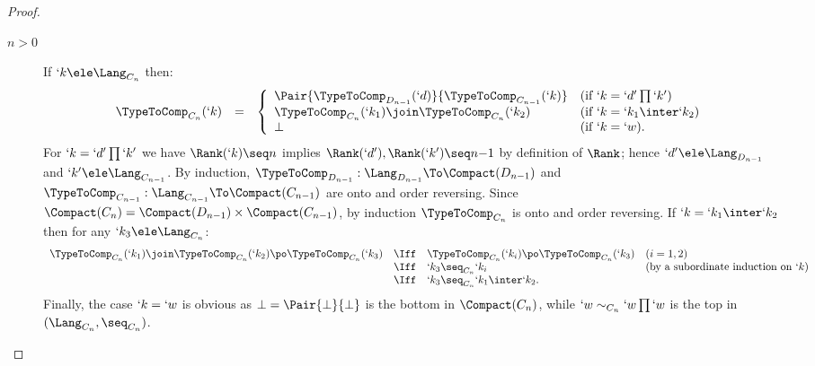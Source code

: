 \documentclass{lmcs}
\begin{document}
\begin{proof}
\begin{description}
 \item[$n>0$]
If $`k \ele \Lang_{C_n}$ then:
%
 \[ \begin{array}{rcl}
 \TypeToComp_{C_n}(`k) 
	&=& 
\left \{
 \begin{array}{ll}
	\Pair{\TypeToComp_{D_{n{-}1}}(`d) }{ \TypeToComp_{C_{n{-}1}}(`k)} & (\textrm{if }`k = `d'\prod `k') \\
	\TypeToComp_{C_n}(`k_1)\join \TypeToComp_{C_n}(`k_2) & (\textrm{if }`k = `k_1\inter`k_2) \\
	\bot & (\textrm{if }`k = `w).
 \end{array} \right.
 \end{array} \]
For $`k = `d'\prod `k'$ we have $\Rank(`k) \seq n$ implies $\Rank(`d'),\Rank(`k') \seq n{-}1$ by definition of $\Rank$; hence 
$`d' \ele \Lang_{D_{n{-}1}}$ and $`k' \ele \Lang_{C_{n{-}1}}$. 
By induction, $\TypeToComp_{D_{n{-}1}}: \Lang_{D_{n{-}1}} \To \Compact(D_{n{-}1})$ and
$\TypeToComp_{C_{n{-}1}}: \Lang_{C_{n{-}1}} \To \Compact(C_{n{-}1})$ are onto and order reversing. 
Since $\Compact(C_n) = \Compact(D_{n{-}1}) \times \Compact(C_{n{-}1})$, 
by induction $\TypeToComp_{C_n}$ is onto and order reversing. 
If $`k = `k_1\inter`k_2$ then for any $`k_3 \ele \Lang_{C_n}$:
%
 \[ \begin{array}{rcl@{\quad}l}
\TypeToComp_{C_n}(`k_1)\join \TypeToComp_{C_n}(`k_2) \po \TypeToComp_{C_n}(`k_3) 
& \Iff & \TypeToComp_{C_n}(`k_i) \po \TypeToComp_{C_n}(`k_3) & (i =1,2) \\ 
& \Iff & `k_3 \seq_{C_{n}} `k_i & (\textrm{by a subordinate induction on $`k$}) \\
& \Iff & `k_3 \seq_{C_{n}} `k_1\inter `k_2.
 \end{array} \]
Finally, the case $`k = `w$ is obvious as $\bot = \Pair{\bot }{ \bot}$ is the bottom in $\Compact(C_n)$, while $`w \sim_{C_n} `w\prod `w$ is the top
in $(\Lang_{C_n}, \seq_{C_{n}})$.


\end{description}
\end{proof}
\end{document}
